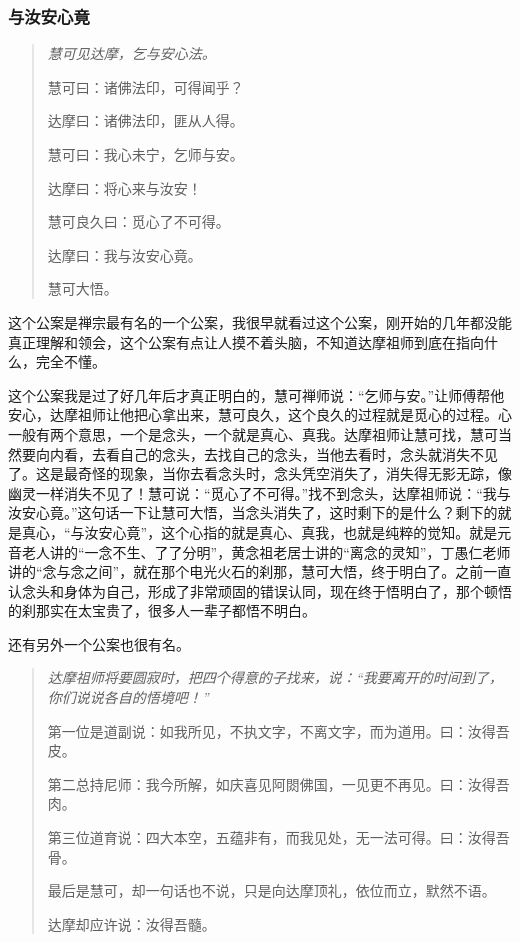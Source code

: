 \subsubsection{与汝安心竟}

\begin{quotation}\it
    慧可见达摩，乞与安心法。

    慧可曰：诸佛法印，可得闻乎？

    达摩曰：诸佛法印，匪从人得。

    慧可曰：我心未宁，乞师与安。

    达摩曰：将心来与汝安！

    慧可良久曰：觅心了不可得。

    达摩曰：我与汝安心竟。

    慧可大悟。
\end{quotation}

这个公案是禅宗最有名的一个公案，我很早就看过这个公案，刚开始的几年都没能真正理解和领会，这个公案有点让人摸不着头脑，不知道达摩祖师到底在指向什么，完全不懂。

这个公案我是过了好几年后才真正明白的，慧可禅师说：“乞师与安。”让师傅帮他安心，达摩祖师让他把心拿出来，慧可良久，这个良久的过程就是觅心的过程。心一般有两个意思，一个是念头，一个就是真心、真我。达摩祖师让慧可找，慧可当然要向内看，去看自己的念头，去找自己的念头，当他去看时，念头就消失不见了。这是最奇怪的现象，当你去看念头时，念头凭空消失了，消失得无影无踪，像幽灵一样消失不见了！慧可说：“觅心了不可得。”找不到念头，达摩祖师说：“我与汝安心竟。”这句话一下让慧可大悟，当念头消失了，这时剩下的是什么？剩下的就是真心，“与汝安心竟”，这个心指的就是真心、真我，也就是纯粹的觉知。就是元音老人讲的“一念不生、了了分明”，黄念祖老居士讲的“离念的灵知”，丁愚仁老师讲的“念与念之间”，就在那个电光火石的刹那，慧可大悟，终于明白了。之前一直认念头和身体为自己，形成了非常顽固的错误认同，现在终于悟明白了，那个顿悟的刹那实在太宝贵了，很多人一辈子都悟不明白。

还有另外一个公案也很有名。

\begin{quotation}\it
    达摩祖师将要圆寂时，把四个得意的子找来，说：“我要离开的时间到了，你们说说各自的悟境吧！”

    第一位是道副说：如我所见，不执文字，不离文字，而为道用。曰：汝得吾皮。

    第二总持尼师：我今所解，如庆喜见阿閦佛国，一见更不再见。曰：汝得吾肉。

    第三位道育说：四大本空，五蕴非有，而我见处，无一法可得。曰：汝得吾骨。

    最后是慧可，却一句话也不说，只是向达摩顶礼，依位而立，默然不语。

    达摩却应许说：汝得吾髓。
\end{quotation}

